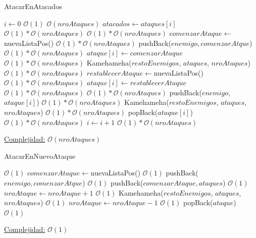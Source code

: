 \documentclass[10pt,a4paper]{article}
\begin{document}
\begin{algorithm}
\caption{AtacarEnAtacados}
\begin{algorithmic}
\State $i \gets 0$ \Comment $\mathcal{O}(1)$
 \Comment $\mathcal{O}(nroAtaques)$
	\State $atacados \gets ataques[i]$ \Comment $\mathcal{O}(1) * \mathcal{O}(nroAtaques)$
	 \Comment $\mathcal{O}(1) * \mathcal{O}(nroAtaques)$
		\State $comenzarAtaque \gets $nuevaListaPos() \Comment $\mathcal{O}(1) * \mathcal{O}(nroAtaques)$
		\State pushBack($enemigo, comenzarAtque$) \Comment $\mathcal{O}(1) * \mathcal{O}(nroAtaques)$
		\State $ataque[i] \gets 	comenzarAtaque$ \Comment $\mathcal{O}(1) * \mathcal{O}(nroAtaques)$
		\State Kamehameha($restoEnemigos$, $ataques$, $nroAtaques$) \Comment $\mathcal{O}(1) * \mathcal{O}(nroAtaques)$
		\State $restablecerAtaque \gets $nuevaListaPos() \Comment $\mathcal{O}(1) * \mathcal{O}(nroAtaques)$
		\State $ataque[i] \gets 	restablecerAtaque$ \Comment $\mathcal{O}(1) * \mathcal{O}(nroAtaques)$
	 \Comment $\mathcal{O}(1) * \mathcal{O}(nroAtaques)$
		\State pushBack($enemigo$, $ataque[i]$) \Comment $\mathcal{O}(1) * \mathcal{O}(nroAtaques)$
		\State Kamehameha($restoEnemigos$, $ataques$, $nroAtaques$) \Comment $\mathcal{O}(1) * \mathcal{O}(nroAtaques)$
		\State popBack($ataque[i]$) \Comment $\mathcal{O}(1) * \mathcal{O}(nroAtaques)$
	\EndIf
	\State $i \gets i + 1$ \Comment $\mathcal{O}(1) * \mathcal{O}(nroAtaques)$
\EndWhile
\EndFunction
\end{algorithmic}
\underline{Complejidad:} $\mathcal{O}(nroAtaques)$\\
    
\end{algorithm}
 \newpage

\begin{algorithm}
\caption{AtacarEnNuevoAtaque}
\begin{algorithmic}

 \Comment $\mathcal{O}(1)$
	\State $comenzarAtaque \gets $nuevaListaPos() \Comment $\mathcal{O}(1)$
	\State pushBack($enemigo, comenzarAtque$) \Comment $\mathcal{O}(1)$
	\State pushBack($comenzarAtaque, ataques$) \Comment $\mathcal{O}(1)$
	\State $nroAtaque \gets nroAtaque + 1$ \Comment $\mathcal{O}(1)$
	\State Kamehameha($restoEnemigos$, $ataques$, $nroAtaques$) \Comment $\mathcal{O}(1)$
	\State $nroAtaque \gets 	nroAtaque - 1$ \Comment $\mathcal{O}(1)$
	\State popBack($ataque$) \Comment $\mathcal{O}(1)$
\EndIf

\EndFunction
\end{algorithmic}
\underline{Complejidad:} $\mathcal{O}(1)$\\
\end{algorithm}
\end{document}
